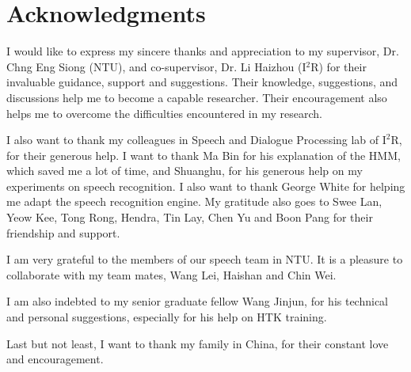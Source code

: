 \chapter* {Acknowledgments}

I would like to express my sincere thanks and appreciation to my
supervisor, Dr. Chng Eng Siong (NTU), and co-supervisor, Dr. Li
Haizhou (I$^2$R) for their invaluable guidance, support and
suggestions. Their knowledge, suggestions, and discussions help me
to become a capable researcher. Their encouragement also helps me to
overcome the difficulties encountered in my research.

I also want to thank my colleagues in Speech and Dialogue Processing
lab of $\textrm{I}^2\textrm{R}$, for their generous help. I want to
thank Ma Bin for his explanation of the HMM, which saved me a lot of
time, and Shuanghu, for his generous help on my experiments on
speech recognition. I also want to thank George White for helping me
adapt the speech recognition engine. My gratitude also goes to Swee
Lan, Yeow Kee, Tong Rong, Hendra, Tin Lay, Chen Yu and Boon Pang for
their friendship and support.

I am very grateful to the members of our speech team in NTU. It is a
pleasure to collaborate with my team mates, Wang Lei, Haishan and
Chin Wei.

I am also indebted to my senior graduate fellow Wang Jinjun, for his
technical and personal suggestions, especially for his help on HTK
training.

Last but not least, I want to thank my family in China, for their
constant love and encouragement.
